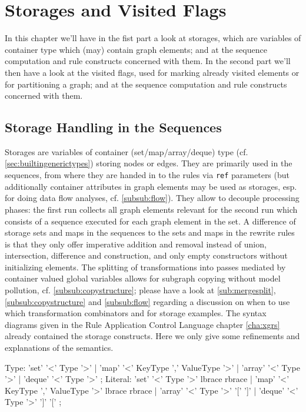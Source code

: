 \chapter{Storages and Visited Flags}
\label{cha:storagesvisited}

In this chapter we'll have in the fist part a look at storages,
which are variables of container type which (may) contain graph elements;
and at the sequence computation and rule constructs concerned with them.
In the second part we'll then have a look at the visited flags, 
used for marking already visited elements or for partitioning a graph;
and at the sequence computation and rule constructs concerned with them.

\section{Storage Handling in the Sequences}\label{sec:storages}

Storages are variables of container (set/map/array/deque) type (cf. \ref{sec:builtingenerictypes}) storing nodes or edges.
They are primarily used in the sequences, from where they are handed in to the rules via \texttt{ref} parameters (but additionally container attributes in graph elements may be used as storages,
esp. for doing data flow analyses, cf. \ref{subsub:flow}).
They allow to decouple processing phases: the first run collects all graph elements relevant for the second run which consists of a sequence executed for each graph element in the set.
A difference of storage sets and maps in the sequences to the sets and maps in the rewrite rules is that they only offer imperative addition and removal instead of union, intersection, difference and construction, and only empty constructors without initializing elements.
The splitting of transformations into passes mediated by container valued global variables allows for subgraph copying without model pollution, cf. \ref{subsub:copystructure}; please have a look at \ref{sub:mergesplit}, \ref{subsub:copystructure} and \ref{subsub:flow} regarding a discussion on when to use which transformation combinators and for storage examples.
The syntax diagrams given in the Rule Application Control Language chapter \ref{cha:xgrs} already contained the storage constructs.
Here we only give some refinements and explanations of the semantics.

\begin{rail}
  Type: 'set' '<' Type '>'
    | 'map' '<' KeyType ',' ValueType '>'
    | 'array' '<' Type '>'
    | 'deque' '<' Type '>'
  ;
  Literal:
    'set' '<' Type '>' lbrace rbrace |
    'map' '<' KeyType ',' ValueType '>' lbrace rbrace |
    'array' '<' Type '>' '[' ']' |
    'deque' '<' Type '>' ']' '['
	;
\end{rail}%

